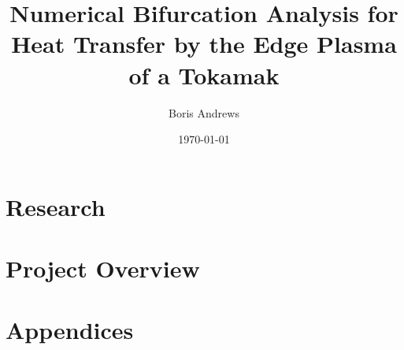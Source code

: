 \documentclass[12pt, a4paper]{report}
\title{Numerical Bifurcation Analysis for Heat Transfer by the Edge Plasma of a Tokamak}
\author{Boris Andrews}
\affil{Mathematical Institute, University of Oxford}
\date{\today}
\begin{document}
    \maketitle
    
    
    \begin{abstract}
    \end{abstract}
    
    
    \newpage
    \tableofcontents
    
    
    \newpage
            
        \part{Research}
            
            
            
            
        \part{Project Overview}
            
            
    
    
    \newpage
        \printbibliography


    \newpage
    \appendix
        \part{Appendices}
            
            
            
            
\end{document}
